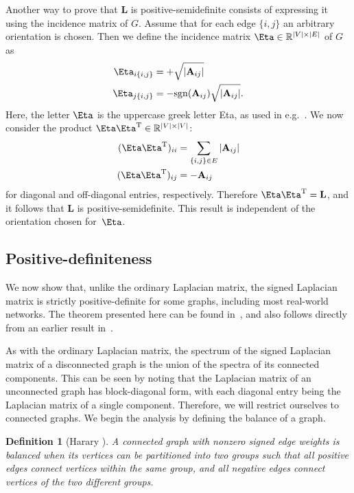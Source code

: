 \documentclass[11pt,a4paper]{book}
\newtheorem{mydef}{Definition}
\begin{document}
Another way to prove that $\mathbf L$ is positive-semidefinite consists of
expressing it using the incidence matrix of $G$.  Assume that for each
edge $\{i,j\}$ an arbitrary orientation is chosen.  Then we define the
incidence matrix $\mathbf \Eta \in \mathbb{R}^{|V| \times |E|}$ of $G$ as
\begin{align}
  \mathbf \Eta_{i \{i,j\}} &= +\sqrt{|\mathbf A_{ij}|} \\
  \mathbf \Eta_{j \{i,j\}} &= -\mathrm{sgn}(\mathbf A_{ij})\sqrt{|\mathbf A_{ij}|}.
\end{align}
Here, the letter $\mathbf \Eta$ is the uppercase greek letter
Eta, as used in e.g.~\cite{b651}.  
We now consider the product $\mathbf \Eta \mathbf \Eta^{\mathrm T} \in
\mathbb{R}^{|V| \times |V|}$: 
\begin{align*}
  (\mathbf \Eta \mathbf \Eta^{\mathrm T})_{ii} &= \sum_{\{i,j\}\in E}
  |\mathbf A_{ij}| \\ 
  (\mathbf \Eta \mathbf \Eta^{\mathrm T})_{ij} &= - \mathbf A_{ij}
\end{align*}
for diagonal and off-diagonal entries, respectively. 
Therefore $\mathbf \Eta \mathbf \Eta^{\mathrm T} = \mathbf L$, and it follows that
$\mathbf L$ is
positive-semidefinite.  This result is independent of the orientation
chosen for~$\mathbf \Eta$.   

\subsection{Positive-definiteness}
\label{subsec:positive-definiteness}
We now show that, unlike the ordinary Laplacian matrix, the signed
Laplacian matrix is strictly positive-definite for some graphs, including most
real-world networks.
The theorem presented here can be found in~\cite{b356}, and also follows
directly from an earlier result in~\cite{b647}.  

As with the ordinary Laplacian matrix, the spectrum of the signed
Laplacian matrix of a disconnected graph is the union of the spectra of
its connected components. 
This can be seen by noting that the Laplacian matrix of an unconnected
graph has block-diagonal form, with each diagonal entry being the
Laplacian matrix of a single component.  
Therefore, we will restrict ourselves to connected graphs.
We begin the analysis by defining the balance of a graph. 

\begin{mydef}[Harary \cite{b355}]
  A connected graph with nonzero signed edge weights is balanced when its
  vertices can be partitioned into two groups such that all positive edges
  connect vertices within the same group, and all negative edges connect
  vertices of the two different groups.
\end{mydef}
\end{document}
